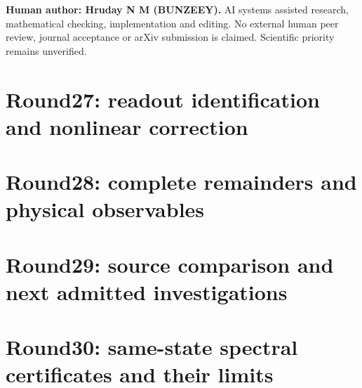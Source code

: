 \documentclass[11pt,a4paper]{article}
\theoremstyle{definition}\newtheorem{definition}[theorem]{Definition}
\theoremstyle{remark}\newtheorem{remark}[theorem]{Remark}
\begin{document}
\begin{center}\small\textbf{Human author: Hruday N M (BUNZEEY).} AI systems assisted research, mathematical checking, implementation and editing. No external human peer review, journal acceptance or arXiv submission is claimed. Scientific priority remains unverified.\end{center}
\clearpage
\tableofcontents
\clearpage









\clearpage\part{Round27: readout identification and nonlinear correction}

\clearpage\part{Round28: complete remainders and physical observables}

\clearpage\part{Round29: source comparison and next admitted investigations}

\clearpage\part{Round30: same-state spectral certificates and their limits}

\clearpage


\clearpage
\appendix





\end{document}

